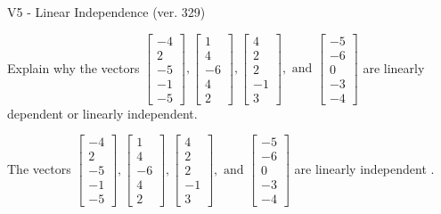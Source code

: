 \begin{exercise}
  \begin{exerciseTitle}V5 - Linear Independence (ver. 329)\end{exerciseTitle}
  \begin{exerciseStatement}
    Explain why the vectors \(\left[\begin{array}{r}
-4 \\
2 \\
-5 \\
-1 \\
-5
\end{array}\right] , \left[\begin{array}{r}
1 \\
4 \\
-6 \\
4 \\
2
\end{array}\right] , \left[\begin{array}{r}
4 \\
2 \\
2 \\
-1 \\
3
\end{array}\right] , \text{ and } \left[\begin{array}{r}
-5 \\
-6 \\
0 \\
-3 \\
-4
\end{array}\right]\) are linearly dependent or linearly independent.	


  \end{exerciseStatement}
  \begin{exerciseAnswer}
   The vectors \(\left[\begin{array}{r}
-4 \\
2 \\
-5 \\
-1 \\
-5
\end{array}\right] , \left[\begin{array}{r}
1 \\
4 \\
-6 \\
4 \\
2
\end{array}\right] , \left[\begin{array}{r}
4 \\
2 \\
2 \\
-1 \\
3
\end{array}\right] , \text{ and } \left[\begin{array}{r}
-5 \\
-6 \\
0 \\
-3 \\
-4
\end{array}\right]\) are 
  	 linearly independent  .
  


  \end{exerciseAnswer}
\end{exercise}